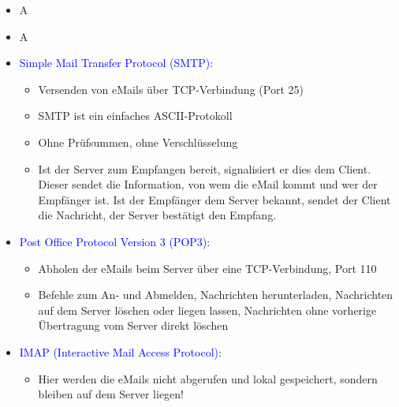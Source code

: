 \begin{itemize}
    \item \todo A
\end{itemize}

\begin{itemize}
    \item \todo A
\end{itemize}

\begin{itemize}
    \item \textcolor{blue}{Simple Mail Transfer Protocol (SMTP):}
    \begin{itemize}
        \item Versenden von eMails über TCP-Verbindung (Port 25)
        \item SMTP ist ein einfaches ASCII-Protokoll
        \item Ohne Prüfsummen, ohne Verschlüsselung
        \item Ist der Server zum Empfangen bereit, signalisiert er dies dem Client. Dieser sendet die Information, von wem die eMail kommt und wer der Empfänger ist. Ist der Empfänger dem Server bekannt, sendet der Client die Nachricht, der Server bestätigt den Empfang.
    \end{itemize}
    \item \textcolor{blue}{Post Office Protocol Version 3 (POP3):}
    \begin{itemize}
        \item Abholen der eMails beim Server über eine TCP-Verbindung, Port 110
        \item Befehle zum An- und Abmelden, Nachrichten herunterladen, Nachrichten auf dem Server löschen oder liegen lassen, Nachrichten ohne vorherige Übertragung vom Server direkt löschen
    \end{itemize}
    \item \textcolor{blue}{IMAP (Interactive Mail Access Protocol):}
    \begin{itemize}
        \item Hier werden die eMails nicht abgerufen und lokal gespeichert, sondern bleiben auf dem Server liegen!
    \end{itemize}
\end{itemize}

